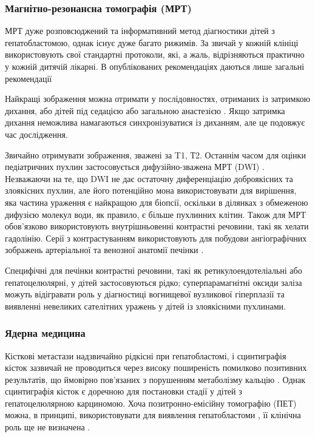 \subsubsection{Магнітно-резонансна томографія (МРТ)} 

МРТ дуже розповсюджений та інформативний метод діагностики дітей з гепатобластомою, однак існує дуже багато рижимів. За звичай у кожній клініці використовують свої стандартні протоколи, які, а жаль, відрізняються практично у кожній дитячій лікарні. В опублікованих рекомендаціях даються лише загальні рекомендації \cite{pmid18975296}

Найкращі зображення можна отримати у послідовностях, отриманих із затримкою дихання, або дітей під седацією або загальною анастезією \cite{pmid19040959}. Якщо затримка дихання неможлива намагаються синхронізуватися із диханням, але це подовжує час дослідження.

Звичайно отримувати зображення, зважені за T1,  Т2. Останнім часом для оцінки педіатричних пухлин застосовується дифузійно-зважена МРТ (DWI) \cite{pmid20070564}. Незважаючи на те, що DWI не дає остаточну диференціацію доброякісних та злоякісних пухлин, але його потенційно мона використовувати для вирішення, яка частина ураження є найкращою для біопсії, оскільки в ділянках з обмеженою дифузією молекул води, як правило, є більше пухлинних клітин. Також для МРТ обов’язково використовують внутрішньовенні контрастні речовини, такі як хелати гадолінію. Серії з контрастуванням використовують для побудови ангіографічних зображень артеріальної та венозної анатомії печінки \cite{pmid20223320}.

Специфічні для печінки контрастні речовини, такі як ретикулоендотеліальні або гепатоцелюлярні, у дітей застосовуються рідко; суперпарамагнітні оксиди заліза можуть відігравати роль у діагностиці вогнищевої вузликової гіперплазії та виявленні невеликих сателітних уражень у дітей із злоякісними пухлинами.

\subsubsection{Ядерна медицина} 

Кісткові метастази надзвичайно рідкісні при гепатобластомі, і сцинтиграфія кісток зазвичай не проводиться через високу поширеність помилково позитивних результатів, що ймовірно пов'язаних з порушенням метаболізму кальцію \cite{pmid20345611}. Однак сцинтиграфія кісток є доречною для постановки стадії у дітей з гепатоцелюлярною карциномою.
Хоча позитронно-емісійну томографію (ПЕТ) можна, в принципі, використовувати для виявлення гепатобластоми \cite{pmid20406943}, її клінічна роль ще не визначена \cite{pmid20438949}.

